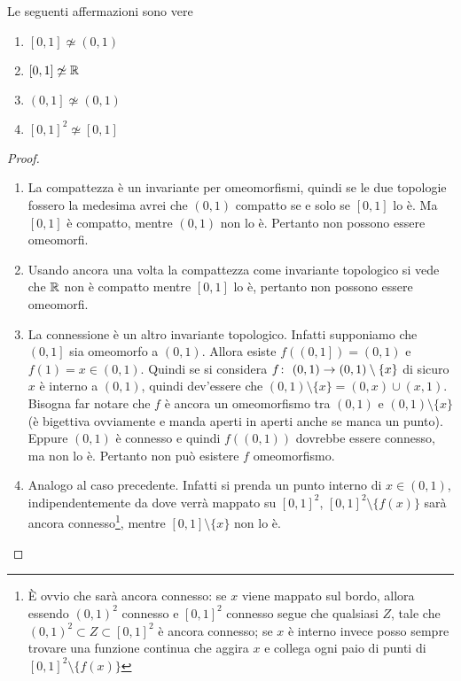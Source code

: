 \begin{theorem}
	Le seguenti affermazioni sono vere
	\begin{enumerate}
		\item $\left[0,1\right] \not\simeq (0,1)$
		\item $\left[0,1\right] \not\simeq \mathbb{R}$
		\item $\left(0,1\right] \not\simeq (0,1)$
		\item $\left[0,1\right]^2 \not\simeq \left[0,1\right]$
	\end{enumerate}
\end{theorem}
\begin{proof}
	\begin{enumerate}
		\item La compattezza è un invariante per omeomorfismi, quindi se le due topologie fossero la medesima avrei che $(0,1)$ compatto se e solo se $\left[0,1\right]$ lo è. Ma $\left[0,1\right]$ è compatto, mentre $(0,1)$ non lo è. Pertanto non possono essere omeomorfi.
		\item Usando ancora una volta la compattezza come invariante topologico si vede che $\mathbb{R}$ non è compatto mentre $\left[0,1\right]$ lo è, pertanto non possono essere omeomorfi.
		\item La connessione è un altro invariante topologico. Infatti supponiamo che $\left(0,1\right]$ sia omeomorfo a $\left(0,1\right)$. Allora esiste $f(\left(0,1\right]) = \left(0,1\right)$ e $f(1) = x \in (0,1)$. Quindi se si considera $f \colon\ (0,1) \rightarrow (0,1)\setminus \{x\}$ di sicuro $x$ è interno a $(0,1)$, quindi dev'essere che $(0,1) \setminus \{x\} = (0, x) \cup (x, 1)$. Bisogna far notare che $f$ è ancora un omeomorfismo tra $(0,1)$ e $(0,1)\setminus \{x\}$ (è bigettiva ovviamente e manda aperti in aperti anche se manca un punto). Eppure $(0,1)$ è connesso e quindi $f((0,1))$ dovrebbe essere connesso, ma non lo è. Pertanto non può esistere $f$ omeomorfismo.
		\item Analogo al caso precedente. Infatti si prenda un punto interno di $x \in (0,1)$, indipendentemente da dove verrà mappato su $\left[0,1\right]^2$, $\left[0,1\right]^2 \setminus \{f(x)\}$ sarà ancora connesso\footnote{È ovvio che sarà ancora connesso: se $x$ viene mappato sul bordo, allora essendo $(0,1)^2$ connesso e $\left[0,1\right]^2$ connesso segue che qualsiasi $Z$, tale che $(0,1)^2 \subset Z \subset \left[0,1\right]^2$ è ancora connesso; se $x$ è interno invece posso sempre trovare una funzione continua che aggira $x$ e collega ogni paio di punti di $\left[0,1\right]^2 \setminus \{f(x)\}$}, mentre $\left[0,1\right] \setminus \{x\}$ non lo è. 
		
	\end{enumerate}
\end{proof}

